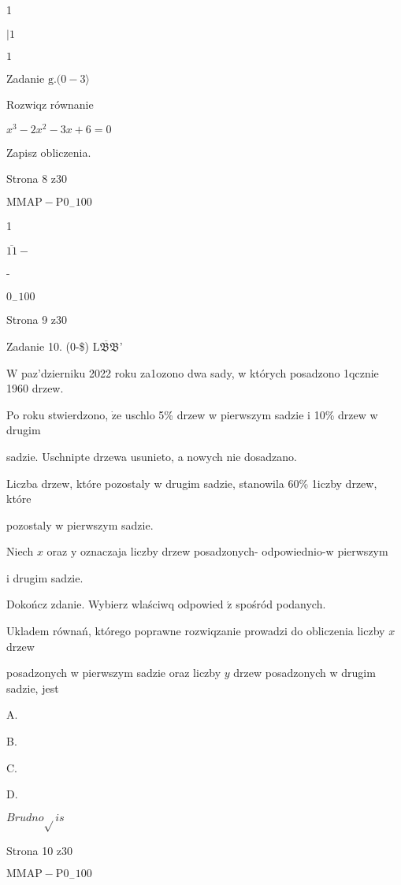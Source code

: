 \documentclass[a4paper,12pt]{article}
\begin{document}
1

$| 1$

$1$

Zadanie $\mathrm{g}. (0-3\rangle$

Rozwiqz równanie

$x^{3}-2x^{2}-3x+6=0$

Zapisz obliczenia.

Strona 8 z30

$\mathrm{M}\mathrm{M}\mathrm{A}\mathrm{P}-\mathrm{P}0_{-}100$





1

$\overline{11}-$

-

$0_{-}100$

Strona 9 z30





Zadanie 10. (0-{\$}) $\overline{\mathrm{L}\mathfrak{B}\mathfrak{B}}$'

$\mathrm{W}$ paz'dzierniku 2022 roku za1ozono dwa sady, w których posadzono 1qcznie 1960 drzew.

Po roku stwierdzono, $\dot{\mathrm{z}}\mathrm{e}$ uschlo 5\% drzew w pierwszym sadzie i 10\% drzew w drugim

sadzie. Uschnipte drzewa usunieto, a nowych nie dosadzano.

Liczba drzew, które pozostaly w drugim sadzie, stanowila 60\% 1iczby drzew, które

pozostaly w pierwszym sadzie.

Niech $x$ oraz $\mathrm{y}$ oznaczaja liczby drzew posadzonych- odpowiednio-w pierwszym

i drugim sadzie.

Dokończ zdanie. Wybierz wlaściwq odpowied $\acute{\mathrm{z}}$ spośród podanych.

Ukladem równań, którego poprawne rozwiqzanie prowadzi do obliczenia liczby $x$ drzew

posadzonych w pierwszym sadzie oraz liczby $y$ drzew posadzonych w drugim sadzie, jest

A. 

B. 

C. 

D. 

$Brudno\sqrt{}is$

Strona 10 z30

$\mathrm{M}\mathrm{M}\mathrm{A}\mathrm{P}-\mathrm{P}0_{-}100$
\end{document}
